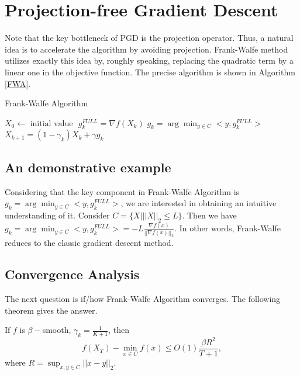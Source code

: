 \documentclass[12pt]{report}
\begin{document}
\section{Projection-free Gradient Descent}
Note that the key bottleneck of PGD is the projection operator. Thus, a natural idea is to accelerate the algorithm by avoiding projection. Frank-Walfe method utilizes exactly this idea by, roughly speaking, replacing the quadratic term by a linear one in the objective function. The precise algorithm is shown in Algorithm \ref{FWA}.
\begin{algorithm}
	\caption{Frank-Walfe Algorithm}\label{FWA}
	\begin{algorithmic}
		\State $X_0 \gets \textrm{ initial value }$
			\State $g_k^{FULL} = \nabla f(X_k)$
			\State $ g_k = \arg\min_{y\in C}<y,g_k^{FULL} > $ 
			\State $ X_{k+1} = (1-\gamma_k)X_k + \gamma g_k$ 
		\EndFor
	\end{algorithmic}
\end{algorithm}

\subsection{An demonstrative example}
Considering that the key component in Frank-Walfe Algorithm is $ g_k = \arg\min_{y\in C}<y,g_k^{FULL} > $, we are interested in obtaining an intuitive understanding of it. Consider $C = \{ X | ||X||_2 \leq L \}$. Then we have 
$ g_k = \arg\min_{y\in C}<y,g_k^{FULL} >  = - L \frac{\nabla f(x)}{|| \nabla f(x)||_2 }$. In other words, Frank-Walfe reduces to the classic gradient descent method.

\subsection{Convergence Analysis}
The next question is if/how Frank-Walfe Algorithm converges. The following theorem gives the answer.\\
\begin{theorem}
	\label{FWA_Converge}
	If $f$ is $\beta-$smooth, $\gamma_k = \frac{1}{K+1}$, then
\begin{equation}
	f(X_T) - \min_{x\in C}f(x) \leq O(1) \frac{\beta R^2}{T+1},
\end{equation}	
where $R = \sup_{x,y \in C} ||x-y ||_2$.	
\end{theorem}
\end{document}
